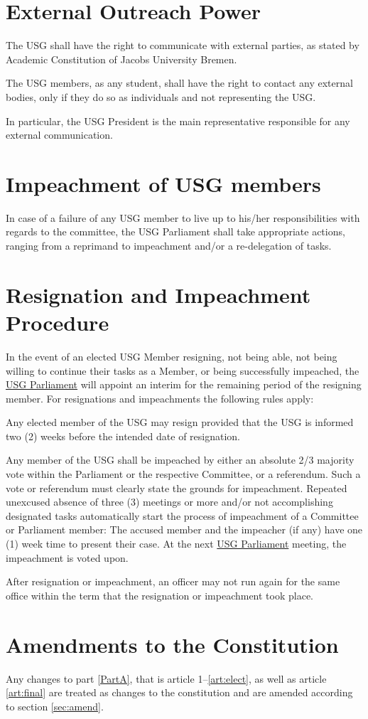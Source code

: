 	\protect\section{External Outreach Power}
	The USG shall have the right to communicate with external parties, as stated by Academic Constitution of Jacobs University Bremen. 
	\protect\begin{parenum}
		\item The USG members, as any student, shall have the right to contact any external bodies, only if they do so as individuals and not representing the USG.
		
		\item In particular, the USG President is the main representative responsible for any external communication.
	\end{parenum}
		
	\protect\section{Impeachment of USG members}
		In case of a failure of any USG member to live up to his/her responsibilities with regards to the committee, the USG Parliament shall take appropriate actions, ranging from a reprimand to impeachment and/or a re-delegation of tasks.
	
	\protect\section{Resignation and Impeachment Procedure}
	In the event of an elected USG Member resigning, not being able, not being willing to continue their tasks as a Member, or being successfully impeached, the \hyperref[USGParliamentDef]{USG Parliament} will appoint an interim for the remaining period of the resigning member. For resignations and impeachments the following rules apply: 
	
	\protect\begin{parenum}
		\item Any elected member of the USG may resign provided that the USG is informed two (2) weeks before the intended date of resignation.		
		\item Any member of the USG shall be impeached by either an absolute 2/3 majority vote within the Parliament or the respective Committee, or a referendum. Such a vote or referendum must clearly state the grounds for impeachment. Repeated unexcused absence of three (3)  meetings or more and/or not accomplishing designated tasks automatically start the process of impeachment of a Committee or Parliament member:
	The accused member and the impeacher (if any) have one (1) week time to present their case.
	At the next \hyperref[USGParliamentDef]{USG Parliament} meeting, the impeachment is voted upon.		
	\item After resignation or impeachment, an officer may not run again for the same office within the term that the resignation or impeachment took place.
	\end{parenum}

\section{Amendments to the Constitution}
Any changes to part \ref{PartA}, that is article 1--\ref{art:elect}, as well as article \ref{art:final} are treated as changes to the constitution and are amended according to section \ref{sec:amend}.